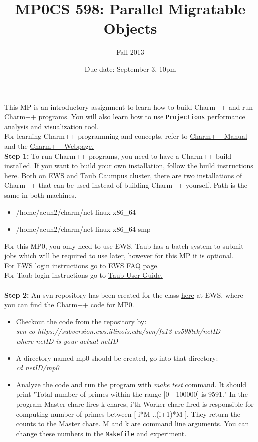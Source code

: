 \documentclass{article}
\title{MP0}
\title{CS 598: Parallel Migratable Objects}
\author{Fall 2013}
\date{Due date: September 3, 10pm}
\begin{document}
\maketitle

This MP is an introductory assignment to learn how to build Charm++ and run
Charm++ programs. You will also learn how to use \texttt{Projections}
performance analysis and visualization tool. \\

For learning Charm++ programming and concepts, refer to
\href{http://charm.cs.illinois.edu/manuals/html/charm++/}{Charm++ Manual} and
the \href{http://charmplusplus.org/}{Charm++ Webpage.}\\

\textbf{Step 1:} To run Charm++ programs, you need to have a Charm++ build
installed. If you want to build your own installation, follow the build
instructions \href{http://charm.cs.illinois.edu/manuals/html/charm++/A.html}{here}. Both
on EWS and Taub Caumpus cluster, there are two installations of Charm++ that can
be used instead of building Charm++ yourself. Path is the same in both machines. 
\begin{itemize}
\item /home/acun2/charm/net-linux-x86\_64
\item /home/acun2/charm/net-linux-x86\_64-smp\\
\end{itemize}
For this MP0, you only need to use EWS. Taub has a batch
system to submit jobs which will be required to use later, however for this MP
it is optional.\\
For EWS login instructions go to
\href{http://it.engineering.illinois.edu/ews/lab-information/ews-faq}{EWS FAQ
page.} \\
For Taub login instructions go to
\href{https://campuscluster.illinois.edu/user\_info/doc/}{Taub User Guide.} \\
\\
\textbf{Step 2:} An svn repository has been created for the class
\href{https://subversion.ews.illinois.edu/svn/fa13-cs598lvk/}{here} at EWS, where you can find the Charm++ code for MP0. \\
\begin{itemize}
\item Checkout the code from the repository by: \\
        \textit{svn co
        https://subversion.ews.illinois.edu/svn/fa13-cs598lvk/netID \\
        where netID is your actual netID}
\item A directory named mp0 should be created, go into that directory: \\
        \textit{cd netID/mp0}
\item Analyze the code and run the program with \textit{make test} command.
It should print "Total number of primes within the range [0 - 100000] is 9591." In the program Master chare fires k chares, i'th Worker chare fired is responsible for
computing number of primes between [ i*M ..(i+1)*M ]. They return the counts to
the Master chare. M and k are command line arguments. You can change these numbers in the \texttt{Makefile} and experiment.

\end{itemize}
\end{document}
